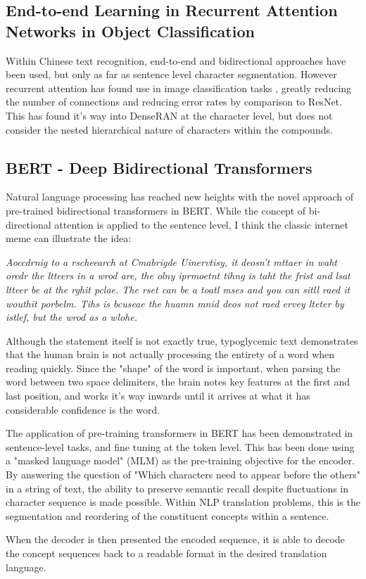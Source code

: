 \subsection{End-to-end Learning in Recurrent Attention Networks in Object Classification}
Within Chinese text recognition, end-to-end \cite{attention-hanzi} and bidirectional \cite{blstm-sentence-level} approaches have been used, but only as far as sentence level character segmentation. However recurrent attention has found use in image classification tasks \cite{residual-attention}, greatly reducing the number of connections and reducing error rates by comparison to ResNet. This has found it's way into DenseRAN \cite{denseran} at the character level, but does not consider the nested hierarchical nature of characters within the compounds.

\subsection{BERT - Deep Bidirectional Transformers}
Natural language processing has reached new heights with the novel approach of pre-trained bidirectional transformers in BERT\cite{bert}. While the concept of bi-directional attention is applied to the sentence level, I think the classic internet meme can illustrate the idea:

\begin{displayquote}
    \textit{Aoccdrnig to a rscheearch at Cmabrigde Uinervtisy, it deosn't mttaer in waht oredr the ltteers in a wrod are, the olny iprmoetnt tihng is taht the frist and lsat ltteer be at the rghit pclae. The rset can be a toatl mses and you can sitll raed it wouthit porbelm. Tihs is bcuseae the huamn mnid deos not raed ervey lteter by istlef, but the wrod as a wlohe.}
\end{displayquote}

Although the statement itself is not exactly true\cite{meme-text}, typoglycemic text demonstrates that the human brain is not actually processing the entirety of a word when reading quickly. Since the "shape" of the word is important, when parsing the word between two space delimiters, the brain notes key features at the first and last position, and works it's way inwards until it arrives at what it has considerable confidence is the word.

The application of pre-training transformers in BERT has been demonstrated in sentence-level tasks, and fine tuning at the token level. This has been done using a "masked language model" (MLM) as the pre-training objective for the encoder. By answering the question of "Which characters need to appear before the others" in a string of text, the ability to preserve semantic recall despite fluctuations in character sequence is made possible. Within NLP translation problems, this is the segmentation and reordering of the constituent concepts within a sentence.

When the decoder is then presented the encoded sequence, it is able to decode the concept sequences back to a readable format in the desired translation language.